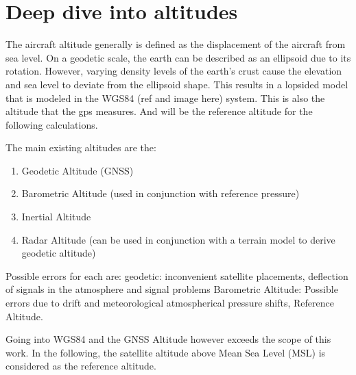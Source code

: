 \section{Deep dive into altitudes}

The aircraft altitude generally is defined as the displacement of the aircraft from sea level.
On a geodetic scale, the earth can be described as an ellipsoid due to its rotation. However, varying density levels of the earth's crust cause the elevation and sea level to deviate from the ellipsoid shape. This results in a lopsided model that is modeled in the WGS84 (ref and image here) system. This is also the altitude that the gps measures. And will be the reference altitude for the following calculations.

The main existing altitudes are the:
\begin{enumerate}
    \item Geodetic Altitude (GNSS)
    \item Barometric Altitude (used in conjunction with reference pressure)
    \item Inertial Altitude
    \item Radar Altitude (can be used in conjunction with a terrain model to derive geodetic altitude)
\end{enumerate}
Possible errors for each are:
geodetic: inconvenient satellite placements, deflection of signals in the atmosphere and signal problems
Barometric Altitude: Possible errors due to drift and meteorological atmospherical pressure shifts, Reference Altitude.

Going into WGS84 and the GNSS Altitude however exceeds the scope of this work. In the following, the satellite altitude above Mean Sea Level (MSL) is considered as the reference altitude.



